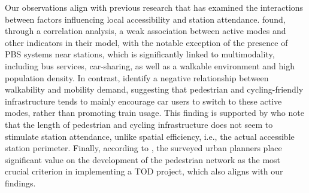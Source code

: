\begin{refsegment}
Our observations align with previous research that has examined the interactions between factors influencing local accessibility and station attendance. \textcolor{blue}{\textcite[511]{caset_measuring_2018}} found, through a correlation analysis, a weak association between active modes and other indicators in their model, with the notable exception of the presence of \acrshort{PBS} systems near stations, which is significantly linked to \gls{multimodality}, including bus services, car-sharing, as well as a walkable environment and high population density. In contrast, \textcolor{blue}{\textcite[8]{olaru_place_2019}} identify a negative relationship between walkability and mobility demand, suggesting that pedestrian and cycling-friendly infrastructure tends to mainly encourage car users to switch to these active modes, rather than promoting train usage. This finding is supported by \textcolor{blue}{\textcite[7]{caset_integrating_2020}} who note that the length of pedestrian and cycling infrastructure does not seem to stimulate station attendance, unlike spatial efficiency, i.e., the actual accessible station perimeter. Finally, according to \textcolor{blue}{\textcite[1021]{maheshwari_evaluating_2022}}, the surveyed urban planners place significant value on the development of the pedestrian network as the most crucial criterion in implementing a \acrshort{TOD} project, which also aligns with our findings.%


\end{refsegment}
